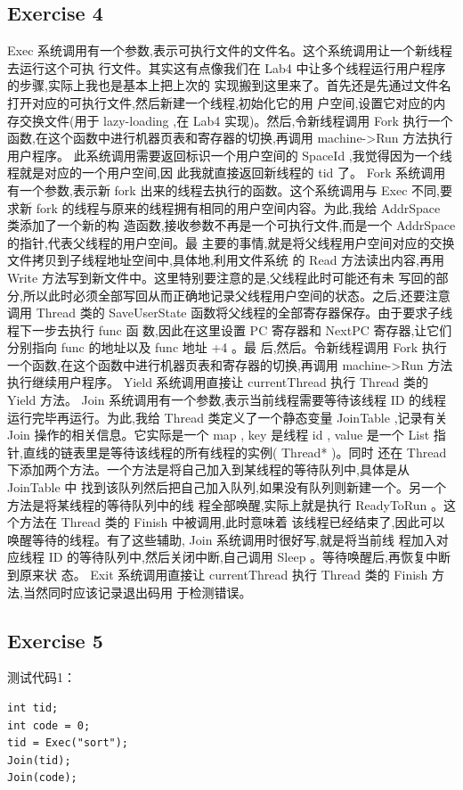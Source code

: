 \documentclass[nofonts]{ctexart}
\begin{document}
\subsection*{Exercise 4}
Exec 系统调用有一个参数,表示可执行文件的文件名。这个系统调用让一个新线程去运行这个可执
行文件。其实这有点像我们在 Lab4 中让多个线程运行用户程序的步骤,实际上我也是基本上把上次的
实现搬到这里来了。首先还是先通过文件名打开对应的可执行文件,然后新建一个线程,初始化它的用
户空间,设置它对应的内存交换文件(用于 lazy-loading ,在 Lab4 实现)。然后,令新线程调用 Fork
执行一个函数,在这个函数中进行机器页表和寄存器的切换,再调用 machine->Run 方法执行用户程序。
此系统调用需要返回标识一个用户空间的 SpaceId ,我觉得因为一个线程就是对应的一个用户空间,因
此我就直接返回新线程的 tid 了。
Fork 系统调用有一个参数,表示新 fork 出来的线程去执行的函数。这个系统调用与 Exec 不同,要
求新 fork 的线程与原来的线程拥有相同的用户空间内容。为此,我给 AddrSpace 类添加了一个新的构
造函数,接收参数不再是一个可执行文件,而是一个 AddrSpace 的指针,代表父线程的用户空间。最
主要的事情,就是将父线程用户空间对应的交换文件拷贝到子线程地址空间中,具体地,利用文件系统
的 Read 方法读出内容,再用 Write 方法写到新文件中。这里特别要注意的是,父线程此时可能还有未
写回的部分,所以此时必须全部写回从而正确地记录父线程用户空间的状态。之后,还要注意调用
Thread 类的 SaveUserState 函数将父线程的全部寄存器保存。由于要求子线程下一步去执行 func 函
数,因此在这里设置 PC 寄存器和 NextPC 寄存器,让它们分别指向 func 的地址以及 func 地址 +4 。最
后,然后。令新线程调用 Fork 执行一个函数,在这个函数中进行机器页表和寄存器的切换,再调用
machine->Run 方法执行继续用户程序。
Yield 系统调用直接让 currentThread 执行 Thread 类的 Yield 方法。
Join 系统调用有一个参数,表示当前线程需要等待该线程 ID 的线程运行完毕再运行。为此,我给
Thread 类定义了一个静态变量 JoinTable ,记录有关 Join 操作的相关信息。它实际是一个 map , key
是线程 id , value 是一个 List 指针,直线的链表里是等待该线程的所有线程的实例( Thread* )。同时
还在 Thread 下添加两个方法。一个方法是将自己加入到某线程的等待队列中,具体是从 JoinTable 中
找到该队列然后把自己加入队列,如果没有队列则新建一个。另一个方法是将某线程的等待队列中的线
程全部唤醒,实际上就是执行 ReadyToRun 。这个方法在 Thread 类的 Finish 中被调用,此时意味着
该线程已经结束了,因此可以唤醒等待的线程。有了这些辅助, Join 系统调用时很好写,就是将当前线
程加入对应线程 ID 的等待队列中,然后关闭中断,自己调用 Sleep 。等待唤醒后,再恢复中断到原来状
态。
Exit 系统调用直接让 currentThread 执行 Thread 类的 Finish 方法,当然同时应该记录退出码用
于检测错误。

\subsection*{Exercise 5}
测试代码1：
\begin{lstlisting}
int tid;
int code = 0;
tid = Exec("sort");
Join(tid);
Join(code);
\end{lstlisting}
\end{document}
